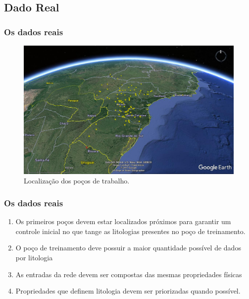 \documentclass[aspectratio=10]{beamer} %
\begin{document}
\subsection{Dado Real}

\begin{frame}
	\frametitle{Os dados reais}
	\begin{figure}[H]
		\centering
		\includegraphics[scale=0.25]{Imagens/Pocos2.png}
		\caption{Localização dos poços de trabalho.}
		\label{real}
	\end{figure}
\end{frame}

\begin{frame}
	\frametitle{Os dados reais}
	\begin{enumerate}
		\item Os primeiros poços devem estar localizados próximos para garantir um controle inicial no que tange as litologias presentes no poço de treinamento. 
		\pause
		\item O poço de treinamento deve possuir a maior quantidade possível de dados por litologia
		\pause
		\item As entradas da rede devem ser compostas das mesmas propriedades físicas
		\pause
		\item Propriedades que definem litologia devem ser priorizadas quando possível.
	\end{enumerate}
\end{frame}
\end{document}
